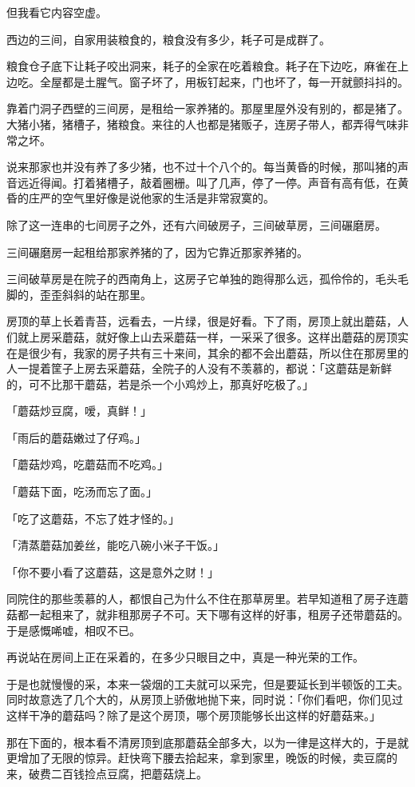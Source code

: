 \documentclass[UTF8]{ctexart}
\begin{document}
但我看它内容空虚。

西边的三间，自家用装粮食的，粮食没有多少，耗子可是成群了。

粮食仓子底下让耗子咬出洞来，耗子的全家在吃着粮食。耗子在下边吃，麻雀在上边吃。全屋都是土腥气。窗子坏了，用板钉起来，门也坏了，每一开就颤抖抖的。

靠着门洞子西壁的三间房，是租给一家养猪的。那屋里屋外没有别的，都是猪了。大猪小猪，猪槽子，猪粮食。来往的人也都是猪贩子，连房子带人，都弄得气味非常之坏。

说来那家也并没有养了多少猪，也不过十个八个的。每当黄昏的时候，那叫猪的声音远近得闻。打着猪槽子，敲着圈栅。叫了几声，停了一停。声音有高有低，在黄昏的庄严的空气里好像是说他家的生活是非常寂寞的。

除了这一连串的七间房子之外，还有六间破房子，三间破草房，三间碾磨房。

三间碾磨房一起租给那家养猪的了，因为它靠近那家养猪的。

三间破草房是在院子的西南角上，这房子它单独的跑得那么远，孤伶伶的，毛头毛脚的，歪歪斜斜的站在那里。

房顶的草上长着青苔，远看去，一片绿，很是好看。下了雨，房顶上就出蘑菇，人们就上房采蘑菇，就好像上山去采蘑菇一样，一采采了很多。这样出蘑菇的房顶实在是很少有，我家的房子共有三十来间，其余的都不会出蘑菇，所以住在那房里的人一提着筐子上房去采蘑菇，全院子的人没有不羡慕的，都说：「这蘑菇是新鲜的，可不比那干蘑菇，若是杀一个小鸡炒上，那真好吃极了。」

「蘑菇炒豆腐，嗳，真鲜！」

「雨后的蘑菇嫩过了仔鸡。」

「蘑菇炒鸡，吃蘑菇而不吃鸡。」

「蘑菇下面，吃汤而忘了面。」

「吃了这蘑菇，不忘了姓才怪的。」

「清蒸蘑菇加姜丝，能吃八碗小米子干饭。」

「你不要小看了这蘑菇，这是意外之财！」

同院住的那些羡慕的人，都恨自己为什么不住在那草房里。若早知道租了房子连蘑菇都一起租来了，就非租那房子不可。天下哪有这样的好事，租房子还带蘑菇的。于是感慨唏嘘，相叹不已。

再说站在房间上正在采着的，在多少只眼目之中，真是一种光荣的工作。

于是也就慢慢的采，本来一袋烟的工夫就可以采完，但是要延长到半顿饭的工夫。同时故意选了几个大的，从房顶上骄傲地抛下来，同时说：「你们看吧，你们见过这样干净的蘑菇吗？除了是这个房顶，哪个房顶能够长出这样的好蘑菇来。」

那在下面的，根本看不清房顶到底那蘑菇全部多大，以为一律是这样大的，于是就更增加了无限的惊异。赶快弯下腰去拾起来，拿到家里，晚饭的时候，卖豆腐的来，破费二百钱捡点豆腐，把蘑菇烧上。
\end{document}
